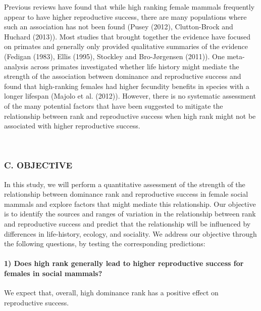 \documentclass[]{article}
\let\oldparagraph\paragraph
\renewcommand{\paragraph}[1]{\oldparagraph{#1}\mbox{}}
\begin{document}
Previous reviews have found that while high ranking female mammals
frequently appear to have higher reproductive success, there are many
populations where such an association has not been found (Pusey (2012),
Clutton-Brock and Huchard (2013)). Most studies that brought together
the evidence have focused on primates and generally only provided
qualitative summaries of the evidence (Fedigan (1983), Ellis (1995),
Stockley and Bro-Jørgensen (2011)). One meta-analysis across primates
investigated whether life history might mediate the strength of the
association between dominance and reproductive success and found that
high-ranking females had higher fecundity benefits in species with a
longer lifespan (Majolo et al. (2012)). However, there is no systematic
assessment of the many potential factors that have been suggested to
mitigate the relationship between rank and reproductive success when
high rank might not be associated with higher reproductive success.

~

\hypertarget{c.-objective}{%
\subsubsection{C. OBJECTIVE}\label{c.-objective}}

In this study, we will perform a quantitative assessment of the strength
of the relationship between dominance rank and reproductive success in
female social mammals and explore factors that might mediate this
relationship. Our objective is to identify the sources and ranges of
variation in the relationship between rank and reproductive success and
predict that the relationship will be influenced by differences in
life-history, ecology, and sociality. We address our objective through
the following questions, by testing the corresponding predictions:

\hypertarget{does-high-rank-generally-lead-to-higher-reproductive-success-for-females-in-social-mammals}{%
\paragraph{\texorpdfstring{\textbf{1) Does high rank generally lead to
higher reproductive success for females in social
mammals?}}{1) Does high rank generally lead to higher reproductive success for females in social mammals?}}\label{does-high-rank-generally-lead-to-higher-reproductive-success-for-females-in-social-mammals}}

We expect that, overall, high dominance rank has a positive effect on
reproductive success.
\end{document}
